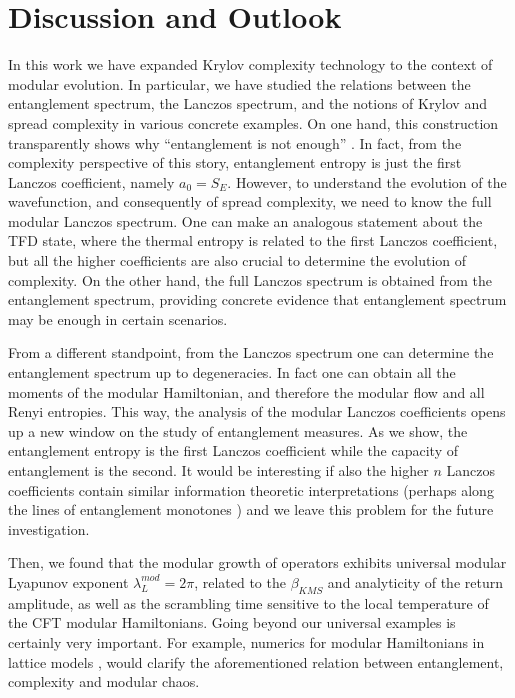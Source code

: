 \documentclass[aps,prl,twocolumn,showpacs,preprintnumbers,amsmath,amssymb]{revtex4-1}
\begin{document}
\section*{Discussion and Outlook}
In this work we have expanded Krylov complexity technology to the context of modular evolution. In particular, we have studied the relations between the entanglement spectrum, the Lanczos spectrum, and the notions of Krylov and spread complexity in various concrete examples. On one hand, this construction transparently shows why ``entanglement is not enough'' \cite{Susskind:2014moa}. In fact, from the complexity perspective of this story, entanglement entropy is just the first Lanczos coefficient, namely $a_0=S_E$. However, to understand the evolution of the wavefunction, and consequently of spread complexity, we need to know the full modular Lanczos spectrum. One can make an analogous statement about the TFD state, where the thermal entropy is related to the first Lanczos coefficient, but all the higher coefficients are also crucial to determine the evolution of complexity. On the other hand, the full Lanczos spectrum is obtained from the entanglement spectrum, providing concrete evidence that entanglement spectrum may be enough in certain scenarios.

From a different standpoint, from the Lanczos spectrum one can determine the entanglement spectrum up to degeneracies. In fact one can obtain all the moments of the modular Hamiltonian, and therefore the modular flow and all Renyi entropies. This way, the analysis of the modular Lanczos coefficients opens up a new window on the study of entanglement measures. As we show, the entanglement entropy is the first Lanczos coefficient while the capacity of entanglement is the second. It would be interesting if also the higher $n$ Lanczos coefficients contain similar information theoretic interpretations (perhaps along the lines of entanglement monotones \cite{Arias:2023duc}) and we leave this problem for the future investigation.

Then, we found that the modular growth of operators exhibits universal modular Lyapunov exponent $\lambda^{mod}_L=2\pi$, related to the $\beta_{KMS}$ and analyticity of the return amplitude, as well as the scrambling time sensitive to the local temperature of the CFT modular Hamiltonians. Going beyond our universal examples is certainly very important. For example, numerics for modular Hamiltonians in lattice models \cite{Peschel:2003rdm,Eisler-Peschel-09-review,Casini:2009sr}, would clarify the aforementioned relation between entanglement, complexity and modular chaos. 
\end{document}
